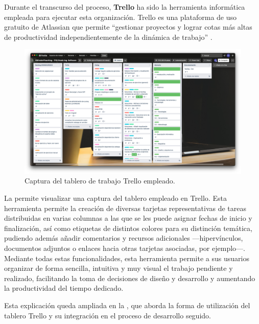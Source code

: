 Durante el transcurso del proceso, \textbf{Trello} ha sido la herramienta informática empleada para ejecutar esta organización. Trello es una plataforma de uso gratuito de Atlassian que permite ``gestionar proyectos y lograr cotas más altas de productividad independientemente de la dinámica de trabajo'' \cite{Her_Trello}.

\begin{figure}[h]
    \centering
    \includegraphics[width=\textwidth]{imagenes/utilizadas/3-2-herramientas/capturaTrello.png}
    \caption{Captura del tablero de trabajo Trello empleado.}
    \label{fig:Trello}
\end{figure}

La  permite visualizar una captura del tablero empleado en Trello.
Esta herramienta permite la creación de diversas tarjetas representativas de tareas distribuidas en varias columnas a las que se les puede asignar fechas de inicio y finalización, así como etiquetas de distintos colores para su distinción temática, pudiendo además añadir comentarios y recursos adicionales ---hipervínculos, documentos adjuntos o enlaces hacia otras tarjetas asociadas, por ejemplo---. Mediante todas estas funcionalidades, esta herramienta permite a sus usuarios organizar de forma sencilla, intuitiva y muy visual el trabajo pendiente y realizado, facilitando la toma de decisiones de diseño y desarrollo y aumentando la productividad del tiempo dedicado.

Esta explicación queda ampliada en la , que aborda la forma de utilización del tablero Trello y su integración en el proceso de desarrollo seguido.
